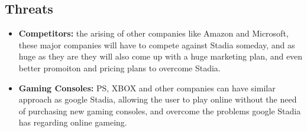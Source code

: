 \subsection{Threats}
\begin{itemize}    
    \item \textbf{Competitors:}
        the arising of other companies like Amazon and Microsoft, these major companies will have to compete against
        Stadia someday, and as huge as they are they will also come up with a huge marketing plan, and even better 
        promoiton and pricing plans to overcome Stadia.

    \item \textbf{Gaming Consoles:}
        PS, XBOX and other companies can have similar approach as google Stadia, allowing the user to play online 
        without the need of purchasing new gaming consoles, and overcome the problems google Stadia has regarding 
        online gameing.
\end{itemize}